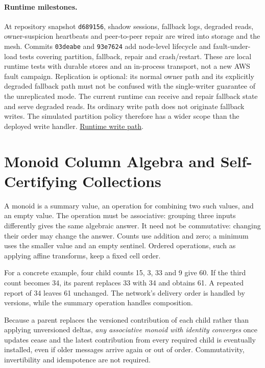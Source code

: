 \documentclass[11pt]{article}
\begin{document}
\paragraph{Runtime milestones.}
At repository snapshot \texttt{d689156}, shadow sessions, fallback logs, degraded reads, owner-suspicion heartbeats and peer-to-peer repair are wired into storage and the mesh. Commits \texttt{03deabe} and \texttt{93e7624} add node-level lifecycle and fault-under-load tests covering partition, fallback, repair and crash/restart. These are local runtime tests with durable stores and an in-process transport, not a new AWS fault campaign. Replication is optional: its normal owner path and its explicitly degraded fallback path must not be confused with the single-writer guarantee of the unreplicated mode. The current runtime can receive and repair fallback state and serve degraded reads. Its ordinary write path does not originate fallback writes. The simulated partition policy therefore has a wider scope than the deployed write handler. \href{https://github.com/indexus/core/blob/e4b9072/docs/architecture/chemin-ecriture.md}{Runtime write path}.

\section{Monoid Column Algebra and Self-Certifying Collections}\hypertarget{ix:algebra}{}
A monoid is a summary value, an operation for combining two such values, and an empty value. The operation must be associative: grouping three inputs differently gives the same algebraic answer. It need not be commutative: changing their order may change the answer. Counts use addition and zero; a minimum uses the smaller value and an empty sentinel. Ordered operations, such as applying affine transforms, keep a fixed cell order.

For a concrete example, four child counts 15, 3, 33 and 9 give 60. If the third count becomes 34, its parent replaces 33 with 34 and obtains 61. A repeated report of 34 leaves 61 unchanged. The network's delivery order is handled by versions, while the summary operation handles composition.

Because a parent replaces the versioned contribution of each child rather than applying unversioned deltas, \emph{any associative monoid with identity converges} once updates cease and the latest contribution from every required child is eventually installed, even if older messages arrive again or out of order. Commutativity, invertibility and idempotence are not required.
\end{document}
